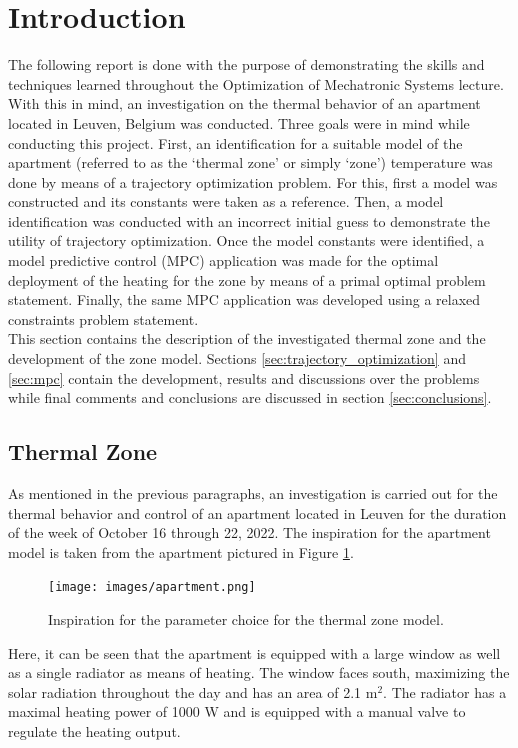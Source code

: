 \section{Introduction}
\label{sec:intro}
The following report is done with the purpose of demonstrating the skills and techniques learned throughout the Optimization of Mechatronic Systems lecture. With this in mind, an investigation on the thermal behavior of an apartment located in Leuven, Belgium was conducted. Three goals were in mind while conducting this project. First, an identification for a suitable model of the apartment (referred to as the `thermal zone' or simply `zone') temperature was done by means of a trajectory optimization problem. For this, first a model was constructed and its constants were taken as a reference. Then, a model identification was conducted with an incorrect initial guess to demonstrate the utility of trajectory optimization. Once the model constants were identified, a model predictive control (MPC) application was made for the optimal deployment of the heating for the zone by means of a primal optimal problem statement. Finally, the same MPC application was developed using a relaxed constraints problem statement. \\

This section contains the description of the investigated thermal zone and the development of the zone model. Sections \ref{sec:trajectory_optimization} and \ref{sec:mpc} contain the development, results and discussions over the problems while final comments and conclusions are discussed in section \ref{sec:conclusions}.

\subsection{Thermal Zone}
\label{subsec:thermal_zone}
As mentioned in the previous paragraphs, an investigation is carried out for the thermal behavior and control of an apartment located in Leuven for the duration of the week of October 16 through 22, 2022. The inspiration for the apartment model is taken from the apartment pictured in Figure \ref{fig:apartment}.

\begin{figure}[H]
\centering
\texttt{[image: images/apartment.png]}
\caption{Inspiration for the parameter choice for the thermal zone model.}
\label{fig:apartment}
\end{figure}

Here, it can be seen that the apartment is equipped with a large window as well as a single radiator as means of heating. The window faces south, maximizing the solar radiation throughout the day and has an area of 2.1 m$^2$. The radiator has a maximal heating power of 1000 W and is equipped with a manual valve to regulate the heating output.

